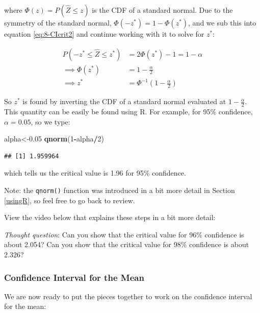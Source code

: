 \documentclass[
]{book}
\newenvironment{Shaded}{\begin{snugshade}}{\end{snugshade}}
\newcommand{\DecValTok}[1]{\textcolor[rgb]{0.00,0.00,0.81}{#1}}
\newcommand{\FloatTok}[1]{\textcolor[rgb]{0.00,0.00,0.81}{#1}}
\newcommand{\FunctionTok}[1]{\textcolor[rgb]{0.13,0.29,0.53}{\textbf{#1}}}
\newcommand{\NormalTok}[1]{#1}
\newcommand{\OtherTok}[1]{\textcolor[rgb]{0.56,0.35,0.01}{#1}}
\newcommand{\SpecialCharTok}[1]{\textcolor[rgb]{0.81,0.36,0.00}{\textbf{#1}}}
\begin{document}
where \(\Phi(z) = P(\hat{Z} \leq z)\) is the CDF of a standard normal. Due to the symmetry of the standard normal, \(\Phi(-z^{*}) = 1- \Phi(z^{*})\), and we sub this into equation \eqref{eq:8-CIcrit2} and continue working with it to solve for \(z^*\):

\begin{equation} 
\begin{split}
P(-z^{*} \leq \hat{Z} \leq z^{*}) &= 2 \Phi(z^*) - 1 = 1 - \alpha \\
\implies \Phi(z^*) &= 1 - \frac{\alpha}{2} \\
\implies z^* &= \Phi^{-1} \left(1 - \frac{\alpha}{2} \right)
\end{split}
\label{eq:8-CIcrit3}
\end{equation}

So \(z^*\) is found by inverting the CDF of a standard normal evaluated at \(1 - \frac{\alpha}{2}\). This quantity can be easily be found using R. For example, for 95\% confidence, \(\alpha = 0.05\), so we type:

\begin{Shaded}
\begin{Highlighting}[]
\NormalTok{alpha}\OtherTok{\textless{}{-}}\FloatTok{0.05}
\FunctionTok{qnorm}\NormalTok{(}\DecValTok{1}\SpecialCharTok{{-}}\NormalTok{alpha}\SpecialCharTok{/}\DecValTok{2}\NormalTok{)}
\end{Highlighting}
\end{Shaded}

\begin{verbatim}
## [1] 1.959964
\end{verbatim}

which tells us the critical value is 1.96 for 95\% confidence.

Note: the \texttt{qnorm()} function was introduced in a bit more detail in Section \ref{usingR}, so feel free to go back to review.

View the video below that explains these steps in a bit more detail:

\emph{Thought question}: Can you show that the critical value for 96\% confidence is about 2.054? Can you show that the critical value for 98\% confidence is about 2.326?

\subsubsection{Confidence Interval for the Mean}\label{confidence-interval-for-the-mean-1}

We are now ready to put the pieces together to work on the confidence interval for the mean:
\end{document}
